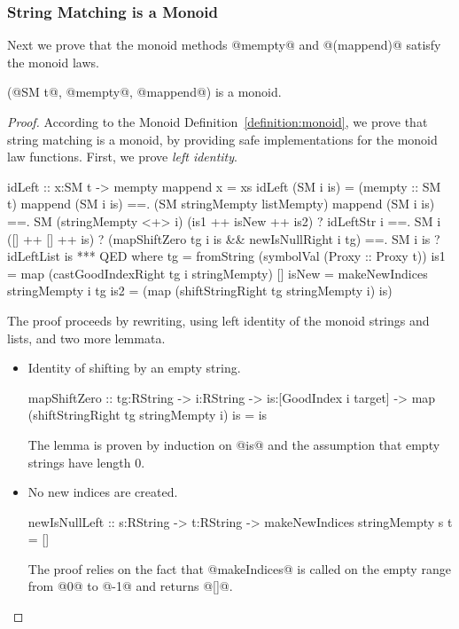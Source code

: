 \subsubsection{String Matching is a Monoid}
Next we prove that the monoid methods @mempty@ and @(mappend)@ satisfy
the monoid laws.
%
\begin{theorem}[SM is a Monoid]\label{theorem:stringmatchers}
(@SM t@, @mempty@, @mappend@)
is a monoid.
\end{theorem}
%
\begin{proof}
According to the Monoid Definition~\ref{definition:monoid},
we prove that string matching is a monoid,
by providing safe implementations for the monoid law functions.
%
First, we prove \textit{left identity}.
\begin{code}
idLeft :: x:SM t -> {mempty mappend x = xs }
idLeft (SM i is)
  =   (mempty :: SM t) mappend (SM i is)
  ==. (SM stringMempty listMempty) mappend (SM i is)
  ==. SM (stringMempty <+> i) (is1 ++ isNew ++ is2)
       ? idLeftStr i
  ==. SM i ([] ++ [] ++ is)
       ? (mapShiftZero tg i is && newIsNullRight i tg)
  ==. SM i is
       ? idLeftList is
  *** QED
  where
    tg    = fromString (symbolVal (Proxy :: Proxy t))
    is1   = map (castGoodIndexRight tg i stringMempty) []
    isNew = makeNewIndices stringMempty i tg
    is2   = (map (shiftStringRight tg stringMempty i) is)
\end{code}

The proof proceeds by rewriting, using left identity of the monoid strings and lists,
and two more lemmata.
\begin{itemize}
\item Identity of shifting by an empty string.
\begin{code}
mapShiftZero :: tg:RString -> i:RString
  -> is:[GoodIndex i target]
  -> {map (shiftStringRight tg stringMempty i) is = is }
\end{code}
The lemma is proven by induction on @is@ and
the assumption that empty strings have length 0.
\item No new indices are created.
\begin{code}
newIsNullLeft :: s:RString -> t:RString
  -> {makeNewIndices stringMempty s t = [] }
\end{code}
The proof relies on the fact that @makeIndices@
is called on the empty range from @0@ to @-1@
and returns @[]@.
\end{itemize}


\end{proof}

